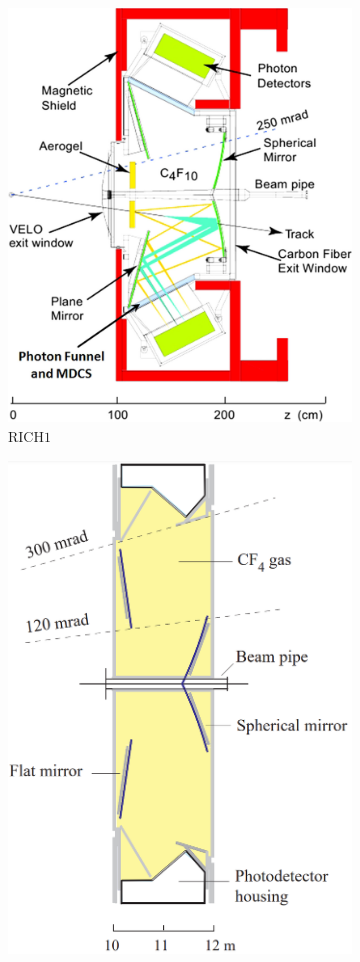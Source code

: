\begin{figure}
    \centering
    \begin{subfigure}{0.48\textwidth}
    \includegraphics[width=\linewidth]{figures/rich1.jpg}
    \caption{RICH$1$}\label{RICH1}
    \end{subfigure}
    \hfill
    \begin{subfigure}{0.48\textwidth}
    \includegraphics[width=0.78\linewidth]{figures/rich2.png}

\end{subfigure}
\end{figure}
